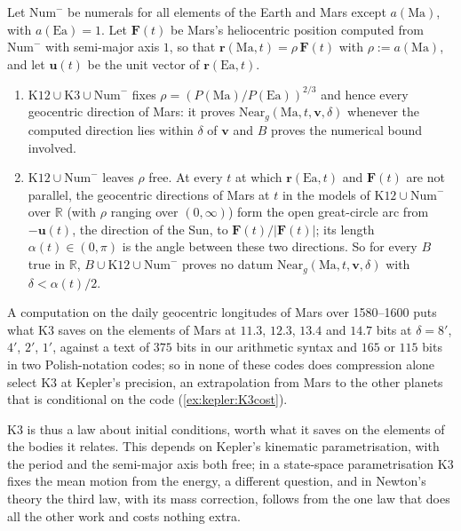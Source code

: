 \begin{proposition}\label{prop:kepler:K3worth}
Let $\mathrm{Num}^-$ be numerals for all elements of the Earth and Mars except $a(\mathrm{Ma})$, with $a(\mathrm{Ea})=1$. Let $\mathbf F(t)$ be Mars's heliocentric position computed from $\mathrm{Num}^-$ with semi-major axis $1$, so that $\mathbf r(\mathrm{Ma},t)=\rho\,\mathbf F(t)$ with $\rho:=a(\mathrm{Ma})$, and let $\mathbf u(t)$ be the unit vector of $\mathbf r(\mathrm{Ea},t)$.
\begin{enumerate}[label=(\alph*),leftmargin=*,itemsep=0pt]
\item $\mathrm{K12}\cup\mathrm{K3}\cup\mathrm{Num}^-$ fixes $\rho=(P(\mathrm{Ma})/P(\mathrm{Ea}))^{2/3}$ and hence every geocentric direction of Mars: it proves $\mathrm{Near}_g(\mathrm{Ma},t,\mathbf v,\delta)$ whenever the computed direction lies within $\delta$ of $\mathbf v$ and $B$ proves the numerical bound involved.
\item $\mathrm{K12}\cup\mathrm{Num}^-$ leaves $\rho$ free. At every $t$ at which $\mathbf r(\mathrm{Ea},t)$ and $\mathbf F(t)$ are not parallel, the geocentric directions of Mars at $t$ in the models of $\mathrm{K12}\cup\mathrm{Num}^-$ over $\mathbb R$ (with $\rho$ ranging over $(0,\infty)$) form the open great-circle arc from $-\mathbf u(t)$, the direction of the Sun, to $\mathbf F(t)/\lvert\mathbf F(t)\rvert$; its length $\alpha(t)\in(0,\pi)$ is the angle between these two directions. So for every $B$ true in $\mathbb R$, $B\cup\mathrm{K12}\cup\mathrm{Num}^-$ proves no datum $\mathrm{Near}_g(\mathrm{Ma},t,\mathbf v,\delta)$ with $\delta<\alpha(t)/2$.
\end{enumerate}
\end{proposition}

A computation on the daily geocentric longitudes of Mars over 1580--1600 puts what $\mathrm{K3}$ saves on the elements of Mars at $11.3$, $12.3$, $13.4$ and $14.7$ bits at $\delta=8'$, $4'$, $2'$, $1'$, against a text of $375$ bits in our arithmetic syntax and $165$ or $115$ bits in two Polish-notation codes; so in none of these codes does compression alone select $\mathrm{K3}$ at Kepler's precision, an extrapolation from Mars to the other planets that is conditional on the code (\cref{ex:kepler:K3cost}).

$\mathrm{K3}$ is thus a law about initial conditions, worth what it saves on the elements of the bodies it relates. This depends on Kepler's kinematic parametrisation, with the period and the semi-major axis both free; in a state-space parametrisation $\mathrm{K3}$ fixes the mean motion from the energy, a different question, and in Newton's theory the third law, with its mass correction, follows from the one law that does all the other work and costs nothing extra.

